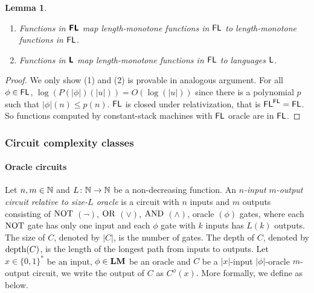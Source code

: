 \documentclass{article}
\newtheorem{lemma}[theorem]{Lemma}
\theoremstyle{definition}
\theoremstyle{remark}
\begin{document}
\begin{lemma}
\label{lemma:Ltwo-maps-L-to-L}
\mbox{}
\begin{enumerate}
 \item Functions in $\text{\bfseries \sffamily \upshape FL}$ map length-monotone functions in $\mathsf{FL}$
       to length-monotone functions in $\mathsf{FL}$.
 \item Functions in $\text{\bfseries \sffamily \upshape L}$ map length-monotone functions in $\mathsf{FL}$
       to languages $\mathsf{L}$.
\end{enumerate}
\end{lemma}

\begin{proof}
We only show (1) and (2) is provable in analogous argument.
For all $\phi \in \mathsf{FL}$, $\log(P(|\phi|)(|u|)) = O(\log(|u|))$
since there is a polynomial $p$ such that $|\phi|(n) \le p(n)$.
$\mathsf{FL}$ is closed under relativization, that is $\mathsf{FL}^{\mathsf{FL}} = \mathsf{FL}$.
So functions computed by constant-stack machines with $\mathsf{FL}$ oracle are in $\mathsf{FL}$.
\end{proof}


\subsubsection{Circuit complexity classes}
\paragraph{Oracle circuits}


Let $n, m \in \mathbb N$ and $L \colon \mathbb N \to \mathbb N$ be a non-decreasing function.
An \emph{$n$-input $m$-output circuit relative to size-$L$ oracle} is a circuit with
$n$ inputs and $m$ outputs consisting of 
$\mathrm{NOT}$ $(\neg)$, $\mathrm{OR}$ $(\vee)$, $\mathrm{AND}$ $(\wedge)$, oracle $(\phi)$ gates,
where each $\mathrm{NOT}$ gate has only one input and each $\phi$ gate with $k$ inputs
has $L(k)$ outputs.
The size of $C$, denoted by $|C|$, is the number of gates.
The depth of $C$, denoted by $\mathop{\rm depth}(C)$, is the length of the longest path
from inputs to outputs.
Let $x \in \{0, 1\}^*$ be an input, $\phi \in \mathbf{LM}$ be an oracle and
$C$ be a $|x|$-input $|\phi|$-oracle $m$-output circuit,
we write the output of $C$ as $C^\phi(x)$.
More formally, we define as below.
\end{document}
